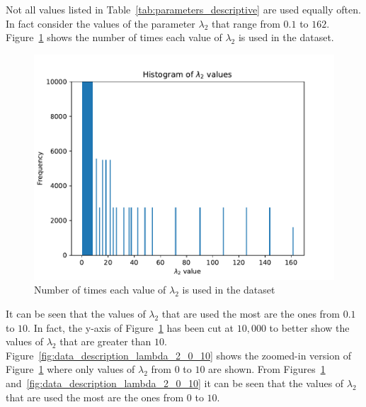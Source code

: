 Not all values listed in Table~\ref{tab:parameters_descriptive} are used equally
often.
In fact consider the values of the parameter \(\lambda_2\) that range from
\(0.1\) to \(162\).
Figure~\ref{fig:data_description_lambda_2} shows the number of times each
value of \(\lambda_2\) is used in the dataset.

\begin{figure}[H]
    \centering
    \includegraphics[width=\linewidth]{chapters/05_numerical_results/Bin/lambda_2_histogram.pdf}
    \caption{Number of times each value of \(\lambda_2\) is used in the dataset}
    \label{fig:data_description_lambda_2}
\end{figure}

It can be seen that the values of \(\lambda_2\) that are used the most are
the ones from \(0.1\) to \(10\).
In fact, the y-axis of Figure~\ref{fig:data_description_lambda_2} has been cut
at \(10,000\) to better show the values of \(\lambda_2\) that are greater than
\(10\).
Figure~\ref{fig:data_description_lambda_2_0_10} shows the zoomed-in version of
Figure~\ref{fig:data_description_lambda_2} where only values of \(\lambda_2\)
from \(0\) to \(10\) are shown.
From Figures~\ref{fig:data_description_lambda_2}
and~\ref{fig:data_description_lambda_2_0_10} it can be seen that the values of
\(\lambda_2\) that are used the most are the ones from \(0\) to \(10\).

